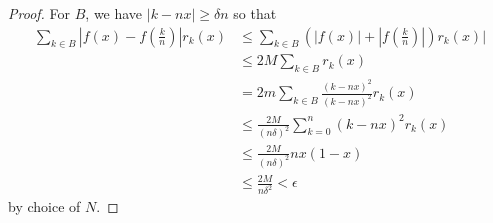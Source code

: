 \documentclass[11pt, a4paper]{memoir}
\theoremstyle{change}
\theoremstyle{plain}
\theoremstyle{nonumberplain}
\newtheorem{proof}{Proof}
\numberwithin{equation}{section}
\begin{document}
\begin{proof}
    For $B$, we have $|k-nx|\geq\delta n$ so that
    \begin{align*}
        \sum\limits_{k\in B}\left\lvert f(x)-f\left(\frac{k}{n}\right)\right\rvert r_k(x) &\leq \sum\limits_{k\in B}\left(|f(x)|+\left\lvert f\left(\frac{k}{n}\right)\right\rvert\right)r_k(x)|\\
                                                                             &\leq 2M\sum\limits_{k\in B}r_k(x)\\
                                                                             &= 2m\sum\limits_{k\in B}\frac{(k-nx)^2}{(k-nx)^2}r_k(x)\\
                                                                             &\leq\frac{2M}{(n\delta)^2}\sum\limits_{k=0}^n(k-nx)^2r_k(x)\\
                                                                             &\leq\frac{2M}{(n\delta)^2}nx(1-x)\\
                                                                             &\leq\frac{2M}{n\delta^2}<\epsilon
    \end{align*}
    by choice of $N$.
\end{proof}
\end{document}
